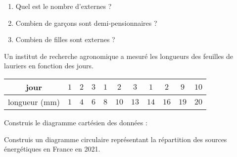 \begin{pageParcoursd}
\begin{enumerate}[leftmargin=*]
 \item Quel est le nombre d'externes ?  
 \item Combien de garçons sont demi-pensionnaires ?  
 \item Combien de filles sont externes ? 
\end{enumerate}


\end{pageParcoursd}

\begin{pageParcourst}

 
Un institut de recherche agronomique a mesuré les longueurs des feuilles de lauriers en fonction des jours.

 \begin{center}
 \begin{tabular}{|c|c|c|c|c|c|c|c|c|c|c|} \hline
  jour  & $1$ & $2$ & $3$ & $1$ & $2$ & $3$& $1$ & $2$ &$9$ &$10$\\  \hline
  longueur (mm) & $1$ & $4$ & $6$ & $8$ & $10$ & $13$& $14$ & $16$ &$19$ &$20$\\\hline
 \end{tabular}
 \end{center}
 
 Construis le diagramme cartésien des données :
 
 


 Construis un diagramme circulaire représentant la répartition des sources énergétiques en France en 2021.

 \begin{minipage}{0.6\linewidth}


\end{minipage}
\end{pageParcourst}
